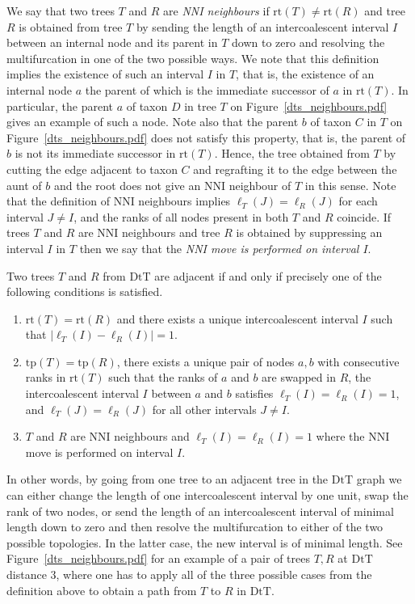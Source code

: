 \documentclass{amsart}
\newcommand{\mdts}{\mathrm{DtT}}
\newcommand{\rt}{\mathrm{rt}}
\newcommand{\tp}{\mathrm{tp}}
\begin{document}
We say that two trees $T$ and $R$ are {\em NNI neighbours} if $\rt(T) \ne \rt(R)$ and tree $R$ is obtained from tree $T$ by sending the length of an intercoalescent interval $I$ between an internal node and its parent in $T$ down to zero and resolving the multifurcation in one of the two possible ways.
We note that this definition implies the existence of such an interval $I$ in $T$, that is, the existence of an internal node $a$ the parent of which is the immediate successor of $a$ in $\rt(T)$.
In particular, the parent $a$ of taxon $D$ in tree $T$ on Figure~\ref{dts_neighbours.pdf} gives an example of such a node.
Note also that the parent $b$ of taxon $C$ in $T$ on Figure~\ref{dts_neighbours.pdf} does not satisfy this property, that is, the parent of $b$ is not its immediate successor in $\rt(T)$.
Hence, the tree obtained from $T$ by cutting the edge adjacent to taxon $C$ and regrafting it to the edge between the aunt of $b$ and the root does not give an NNI neighbour of $T$ in this sense.
Note that the definition of NNI neighbours implies $\ell_T(J) = \ell_R(J)$ for each interval $J \ne I$, and the ranks of all nodes present in both $T$ and $R$ coincide.
If trees $T$ and $R$ are NNI neighbours and tree $R$ is obtained by suppressing an interval $I$ in $T$ then we say that the {\em NNI move is performed on interval $I$}.

Two trees $T$ and $R$ from $\mdts$ are adjacent if and only if precisely one of the following conditions is satisfied.
\begin{enumerate}[(1)]
\item $\rt(T) = \rt(R)$ and there exists a unique intercoalescent interval $I$ such that $|\ell_T(I) - \ell_R(I)| = 1$.
\item $\tp(T) = \tp(R)$, there exists a unique pair of nodes $a,b$ with consecutive ranks in $\rt(T)$ such that the ranks of $a$ and $b$ are swapped in $R$, the intercoalescent interval $I$ between $a$ and $b$ satisfies $\ell_T(I) = \ell_R(I) = 1$, and $\ell_T(J) = \ell_R(J)$ for all other intervals $J \ne I$.
\item $T$ and $R$ are NNI neighbours and $\ell_T(I) = \ell_R(I) = 1$ where the NNI move is performed on interval $I$.
\end{enumerate}

In other words, by going from one tree to an adjacent tree in the $\mdts$ graph we can either change the length of one intercoalescent interval by one unit, swap the rank of two nodes, or send the length of an intercoalescent interval of minimal length down to zero and then resolve the multifurcation to either of the two possible topologies.
In the latter case, the new interval is of minimal length.
See Figure~\ref{dts_neighbours.pdf} for an example of a pair of trees $T,R$ at $\mdts$ distance $3$, where one has to apply all of the three possible cases from the definition above to obtain a path from $T$ to $R$ in $\mdts$.
\end{document}
